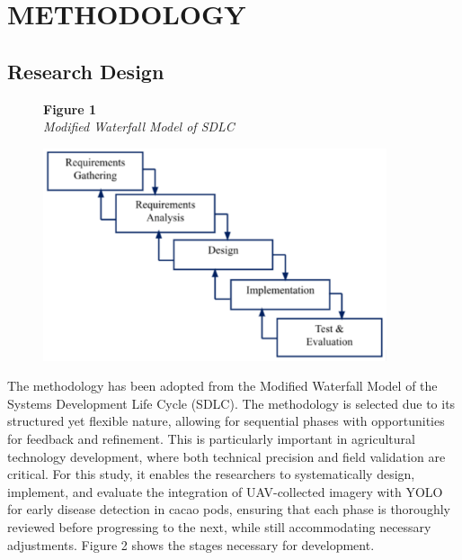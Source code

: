 \chapter{METHODOLOGY}

\section{Research Design}

\begin{figure}[H]
	\raggedright
	\textbf{Figure 1} \\ %
	\textit{Modified Waterfall Model of SDLC} %

	\vspace{0.5em}
	\centering
	\includegraphics[width=0.9\textwidth]{figures/waterfall.pdf} %

	\vspace{0.5em}
	\raggedright

	\label{fig:waterfall}
\end{figure}

The methodology has been adopted from the Modified Waterfall Model of the Systems Development Life Cycle (SDLC). The methodology is selected due to its structured yet flexible nature, allowing for sequential phases with opportunities for feedback and refinement. This is particularly important in agricultural technology development, where both technical precision and field validation are critical. For this study, it enables the researchers to systematically design, implement, and evaluate the integration of UAV-collected imagery with YOLO for early disease detection in cacao pods, ensuring that each phase is thoroughly reviewed before progressing to the next, while still accommodating necessary adjustments. Figure 2 shows the stages necessary for development.

